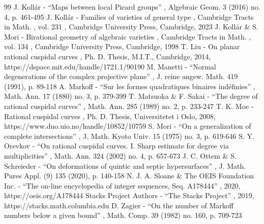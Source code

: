 \documentclass[11pt]{article}
\theoremstyle{plain}
\theoremstyle{definition}
\begin{document}
\begin{thebibliography}{99}
 J. Kollár - “Maps between local Picard groups” , Algebraic Geom. 3 (2016) no. 4, p. 461-495
 J. Kollár - Families of varieties of general type , Cambridge Tracts in Math. , vol. 231 , Cambridge University Press, Cambridge, 2023
 J. Kollár \& S. Mori - Birational geometry of algebraic varieties , Cambridge Tracts in Math. , vol. 134 , Cambridge University Press, Cambridge, 1998
 T. Liu - On planar rational cuspidal curves , Ph. D. Thesis, M.I.T., Cambridge, 2014, https://dspace.mit.edu/handle/1721.1/90190
 M. Manetti - “Normal degenerations of the complex projective plane” , J. reine angew. Math. 419 (1991), p. 89-118
 A. Markoff - “Sur les formes quadratiques binaires indéfinies” , Math. Ann. 17 (1880) no. 3, p. 379-399
 T. Matsuoka \& F. Sakai - “The degree of rational cuspidal curves” , Math. Ann. 285 (1989) no. 2, p. 233-247
 T. K. Moe - Rational cuspidal curves , Ph. D. Thesis, Universitetet i Oslo, 2008, https://www.duo.uio.no/handle/10852/10759
 S. Mori - “On a generalization of complete intersections” , J. Math. Kyoto Univ. 15 (1975) no. 3, p. 619-646
 S. Y. Orevkov - “On rational cuspidal curves. I. Sharp estimate for degree via multiplicities” , Math. Ann. 324 (2002) no. 4, p. 657-673
 J. C. Ottem \& S. Schreieder - “On deformations of quintic and septic hypersurfaces” , J. Math. Pures Appl. (9) 135 (2020), p. 140-158
 N. J. A. Sloane \& The OEIS Foundation Inc. - “The on-line encyclopedia of integer sequences, Seq. A178444” , 2020, https://oeis.org/A178444
 Stacks Project Authors - “The Stacks Project” , 2019, https://stacks.math.columbia.edu
 D. Zagier - “On the number of Markoff numbers below a given bound” , Math. Comp. 39 (1982) no. 160, p. 709-723
\end{thebibliography}
\end{document}
